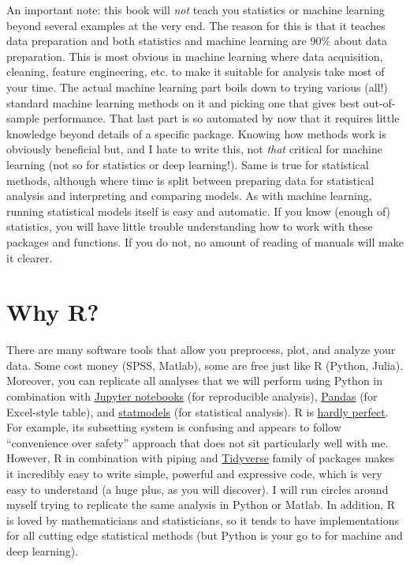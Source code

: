 \documentclass[
]{book}
\begin{document}
An important note: this book will \emph{not} teach you statistics or machine learning beyond several examples at the very end. The reason for this is that it teaches data preparation and both statistics and machine learning are 90\% about data preparation. This is most obvious in machine learning where data acquisition, cleaning, feature engineering, etc. to make it suitable for analysis take most of your time. The actual machine learning part boils down to trying various (all!) standard machine learning methods on it and picking one that gives best out-of-sample performance. That last part is so automated by now that it requires little knowledge beyond details of a specific package. Knowing how methods work is obviously beneficial but, and I hate to write this, not \emph{that} critical for machine learning (not so for statistics or deep learning!). Same is true for statistical methods, although where time is split between preparing data for statistical analysis and interpreting and comparing models. As with machine learning, running statistical models itself is easy and automatic. If you know (enough of) statistics, you will have little trouble understanding how to work with these packages and functions. If you do not, no amount of reading of manuals will make it clearer.

\hypertarget{why-r}{%
\section*{Why R?}\label{why-r}}

There are many software tools that allow you preprocess, plot, and analyze your data. Some cost money (SPSS, Matlab), some are free just like R (Python, Julia). Moreover, you can replicate all analyses that we will perform using Python in combination with \href{https://jupyter.org/}{Jupyter notebooks} (for reproducible analysis), \href{https://pandas.pydata.org/}{Pandas} (for Excel-style table), and \href{https://www.statsmodels.org/stable/index.html}{statmodels} (for statistical analysis). R is \href{https://github.com/ReeceGoding/Frustration-One-Year-With-R}{hardly perfect}. For example, its subsetting system is confusing and appears to follow ``convenience over safety'' approach that does not sit particularly well with me. However, R in combination with piping and \href{https://www.tidyverse.org/}{Tidyverse} family of packages makes it incredibly easy to write simple, powerful and expressive code, which is very easy to understand (a huge plus, as you will discover). I will run circles around myself trying to replicate the same analysis in Python or Matlab. In addition, R is loved by mathematicians and statisticians, so it tends to have implementations for all cutting edge statistical methods (but Python is your go to for machine and deep learning).
\end{document}

